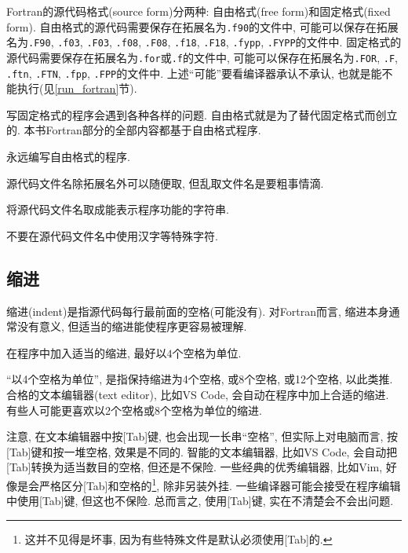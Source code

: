 Fortran的源代码格式(source form)分两种: 自由格式(free form)和固定格式(fixed form). 自由格式的源代码需要保存在拓展名为\texttt{.f90}的文件中, 可能可以保存在拓展名为\texttt{.F90}, \texttt{.f03}, \texttt{.F03}, \texttt{.f08}, \texttt{.F08}, \texttt{.f18}, \texttt{.F18}, \texttt{.fypp}, \texttt{.FYPP}的文件中. 固定格式的源代码需要保存在拓展名为\texttt{.for}或\texttt{.f}的文件中, 可能可以保存在拓展名为\texttt{.FOR}, \texttt{.F}, \texttt{.ftn}, \texttt{.FTN}, \texttt{.fpp}, \texttt{.FPP}的文件中. 上述``可能''要看编译器承认不承认, 也就是能不能执行(见\ref{run_fortran}节).

写固定格式的程序会遇到各种各样的问题. 自由格式就是为了替代固定格式而创立的. 本书Fortran部分的全部内容都基于自由格式程序.

\begin{convention}
    永远编写自由格式的程序.
\end{convention}

源代码文件名除拓展名外可以随便取, 但乱取文件名是要粗事情滴.

\begin{convention}
    将源代码文件名取成能表示程序功能的字符串.
\end{convention}

\begin{convention}
    不要在源代码文件名中使用汉字等特殊字符.
\end{convention}

\subsection{缩进}

缩进(indent)是指源代码每行最前面的空格(可能没有). 对Fortran而言, 缩进本身通常没有意义, 但适当的缩进能使程序更容易被理解.

\begin{convention}\label{fortran_indent}
    在程序中加入适当的缩进, 最好以$4$个空格为单位.
\end{convention}

``以4个空格为单位'', 是指保持缩进为4个空格, 或8个空格, 或12个空格, 以此类推. 合格的文本编辑器(text editor), 比如VS Code, 会自动在程序中加上合适的缩进. 有些人可能更喜欢以2个空格或8个空格为单位的缩进.

注意, 在文本编辑器中按[Tab]键, 也会出现一长串``空格'', 但实际上对电脑而言, 按[Tab]键和按一堆空格, 效果是不同的. 智能的文本编辑器, 比如VS Code, 会自动把[Tab]转换为适当数目的空格, 但还是不保险. 一些经典的优秀编辑器, 比如Vim, 好像是会严格区分[Tab]和空格的\footnote{
    这并不见得是坏事, 因为有些特殊文件是默认必须使用[Tab]的.
}, 除非另装外挂. 一些编译器可能会接受在程序编辑中使用[Tab]键, 但这也不保险. 总而言之, 使用[Tab]键, 实在不清楚会不会出问题.

